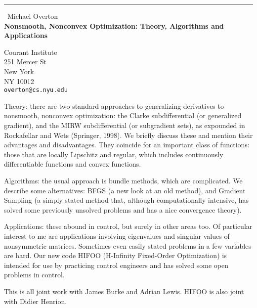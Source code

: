 \documentclass{report}
\begin{document}
\begin{center}
\rule{6in}{1pt} \
{\large Michael Overton \\
{\bf Nonsmooth, Nonconvex Optimization: Theory, Algorithms and Applications}}

Courant Institute \\ 251 Mercer St \\ New York \\ NY 10012
\\
{\tt overton@cs.nyu.edu}\end{center}

Theory: there are two standard approaches to generalizing derivatives
to nonsmooth, nonconvex optimization: the Clarke subdifferential (or
generalized gradient), and the MIRW subdifferential (or subgradient sets),
as expounded in Rockafellar and Wets (Springer, 1998). We briefly discuss
these and mention their advantages and disadvantages. They coincide for
an important class of functions: those that are locally Lipschitz and regular,
which includes continuously differentiable functions and convex functions.

Algorithms: the usual approach is bundle methods, which are complicated.
We describe some alternatives: BFGS (a new look at an old method), and
Gradient Sampling (a simply stated method that, although computationally
intensive, has solved some previously unsolved problems and has a nice
convergence theory).

Applications: these abound in control, but surely in other areas too.
Of particular interest to me are applications involving eigenvalues
and singular values of nonsymmetric matrices. Sometimes even
easily stated problems in a few variables are hard. Our new code
HIFOO (H-Infinity Fixed-Order Optimization) is intended for use by
practicing control engineers and has solved some open problems in control.

This is all joint work with James Burke and Adrian Lewis.
HIFOO is also joint with Didier Henrion.
\end{document}

